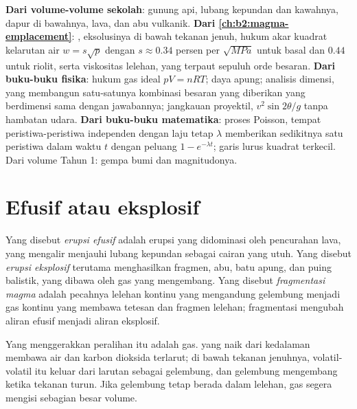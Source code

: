 \begin{recall}
\textbf{Dari volume-volume sekolah}: gunung api, lubang kepundan dan kawahnya, dapur
 di bawahnya, lava, dan abu vulkanik. \textbf{Dari
\cref{ch:b2:magma-emplacement}}: , eksolusinya di bawah
tekanan jenuh, hukum akar kuadrat kelarutan air $w = s\sqrt p$ dengan
$s \approx 0.34$ persen per $\sqrt{\unit{MPa}}$ untuk basal dan $0.44$ untuk
riolit, serta viskositas lelehan, yang terpaut sepuluh orde besaran.
\textbf{Dari buku-buku fisika}: hukum gas ideal $pV = nRT$; daya apung;
analisis dimensi, yang membangun satu-satunya kombinasi besaran yang diberikan
yang berdimensi sama dengan jawabannya; jangkauan proyektil, $v^2\sin 2\theta/g$
tanpa hambatan udara. \textbf{Dari buku-buku matematika}: proses Poisson,
tempat peristiwa-peristiwa independen dengan laju tetap $\lambda$ memberikan sedikitnya satu peristiwa
dalam waktu $t$ dengan peluang $1 - e^{-\lambda t}$; garis lurus kuadrat terkecil.
Dari volume Tahun 1: gempa bumi dan magnitudonya.
\end{recall}

\section{Efusif atau eksplosif}

\begin{definition}\label{def:b2:eruptive-styles:regimes}
Yang disebut \emph{erupsi efusif} adalah erupsi yang didominasi oleh
pencurahan lava, yang mengalir menjauhi lubang kepundan sebagai cairan yang utuh. Yang disebut
\emph{erupsi eksplosif} terutama menghasilkan fragmen,
abu, batu apung, dan puing balistik, yang dibawa oleh gas yang mengembang. Yang disebut \emph{fragmentasi
magma} adalah pecahnya lelehan kontinu
yang mengandung gelembung menjadi gas kontinu yang membawa tetesan dan fragmen lelehan;
fragmentasi mengubah aliran efusif menjadi aliran eksplosif.
\end{definition}

Yang menggerakkan peralihan itu adalah gas.  yang naik dari kedalaman membawa
air dan karbon dioksida terlarut; di bawah tekanan jenuhnya, volatil-volatil itu
keluar dari larutan sebagai gelembung, dan gelembung mengembang ketika tekanan turun.
Jika gelembung tetap berada dalam lelehan, gas segera mengisi sebagian besar volume.

